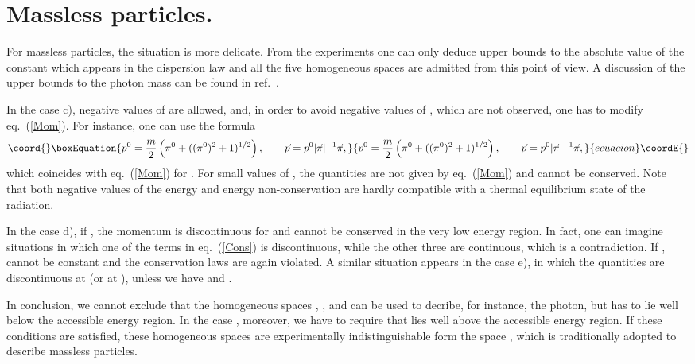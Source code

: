\documentclass[a4paper,12pt]{article}
\begin{document}
\section{Massless particles.}

For massless particles, the situation is more delicate. From the experiments one can only deduce upper bounds to the absolute value of the constant \coordHE{} which appears in the dispersion law and all the five homogeneous spaces are admitted from this point of view. A discussion of the upper bounds to the photon mass can be found in ref.\ \cite{Jackson}. 

In the case c), negative values of \coordHE{} are allowed, and, in order to avoid negative values of \coordHE{}, which are not observed, one has to modify eq.\ (\ref{Mom}). For instance, one can use the formula
\begin{equation}\coord{}\boxEquation{ 
p^0 =  \frac m 2 \left(\pi^0 + ((\pi^0)^2 + 1)^{1/2}\right), \qquad
\vec p = p^0 |\vec\pi|^{-1} \vec\pi,
}{ 
p^0 =  \frac m 2 \left(\pi^0 + ((\pi^0)^2 + 1)^{1/2}\right), \qquad
\vec p = p^0 |\vec\pi|^{-1} \vec\pi,
}{ecuacion}\coordE{}\end{equation} 
which coincides with  eq.\ (\ref{Mom}) for \coordHE{}. For small values of \coordHE{}, the quantities \coordHE{} are not given by eq.\  (\ref{Mom}) and cannot be conserved. Note that both negative values of the energy and energy non-conservation are hardly compatible with a thermal equilibrium state of the radiation.

In the case d), if \coordHE{}, the momentum \coordHE{} is discontinuous for \coordHE{}  and cannot be conserved in the very low energy region. In fact, one can imagine situations in which one of the terms in eq.\ (\ref{Cons}) is discontinuous, while the other three are continuous, which is a contradiction. If \coordHE{}, \coordHE{} cannot be constant and the conservation laws are again violated. A similar situation appears in the case e), in which  the quantities \coordHE{} are discontinuous at \coordHE{} (or at \coordHE{}), unless we have \coordHE{} and \coordHE{}.

In conclusion, we cannot exclude that the homogeneous spaces \coordHE{}, \coordHE{}, \coordHE{} and \coordHE{} can be used to decribe, for instance, the photon, but \coordHE{} has to lie well below the accessible energy region. In the case \coordHE{}, moreover, we have to require that \coordHE{} lies well above the accessible energy region. If these conditions are satisfied, these homogeneous spaces are experimentally indistinguishable form the space \coordHE{}, which is traditionally adopted to describe massless particles.
\end{document}
